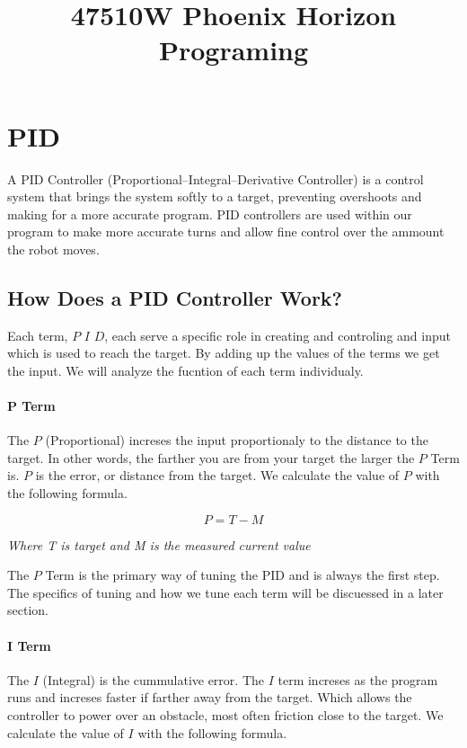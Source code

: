 \documentclass{article}
\title{47510W Phoenix Horizon Programing}
\date{}
\author{}
\begin{document}
 \maketitle
 \tableofcontents
 \newpage

 \section{PID}
    A PID Controller (Proportional–Integral–Derivative Controller) is a control system that brings the system softly to a target, preventing overshoots and making for a more accurate program. PID controllers are used within our program to make more accurate turns and allow fine control over the ammount the robot moves.

\subsection{How Does a PID Controller Work?}
    Each term, $P$ $I$ $D$, each serve a specific role in creating and controling and input which is used to reach the target. By adding up the values of the terms we get the input. We will analyze the fucntion of each term individualy.

\paragraph{P Term}
    The $P$ (Proportional) increses the input proportionaly to the distance to the target. In other words, the farther you are from your target the larger the $P$ Term is. $P$ is the error, or distance from the target. We calculate the value of $P$ with the following formula.

    $$ P = T - M$$
    \begin{center}\em{Where T is target and M is the measured current value}\end{center}

    The $P$ Term is the primary way of tuning the PID and is always the first step. The specifics of tuning and how we tune each term will be discuessed in a later section.

\paragraph{I Term}
    The $I$ (Integral) is the cummulative error. The $I$ term increses as the program runs and increses faster if farther away from the target. Which allows the controller to power over an obstacle, most often friction close to the target. We calculate the value of $I$ with the following formula.
\end{document}
